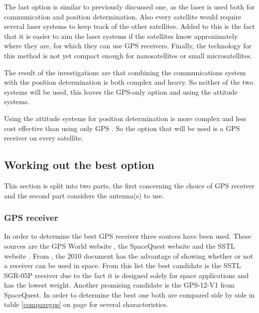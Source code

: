 The last option is similar to previously discussed one, as the laser is used both for communication and position determination. Also every satellite would require several laser systems to keep track of the other satellites. Added to this is the fact that it is easier to aim the laser systems if the satellites know approximately where they are, for which they can use \acs{GPS} receivers. Finally, the technology for this method is not yet compact enough for nanosatellites or small microsatellites.

The result of the investigations are that combining the communications system with the position determination is both complex and heavy. So neither of the two systems will be used, this leaves the \acs{GPS}-only option and using the attitude systems.

Using the attitude systems for position determination is more complex and less cost effective than using only \acs{GPS} \cite{MicroGPS}. So the option that will be used is a \acs{GPS} receiver on every satellite.

\subsection{Working out the best option}
\label{navi3}
This section is split into two parts, the first concerning the choice of \acs{GPS} receiver and the second part considers the antenna(s) to use.

\subsubsection{GPS receiver}
In order to determine the best \acs{GPS} receiver three sources have been used. These sources are the GPS World website \cite{SurveyGPS}, the SpaceQuest website \cite{spacequest} and the \ac{SSTL} website \cite{Surreygps}. From \cite{SurveyGPS}, the 2010 document has the advantage of showing whether or not a receiver can be used in space. From this list the best candidate is the \acs{SSTL} SGR-05P receiver due to the fact it is designed solely for space applications and has the lowest weight. Another promising candidate is the GPS-12-V1 from SpaceQuest. In order to determine the best one both are compared side by side in table \ref{comparegps} on page \pageref{comparegps} for several characteristics.

